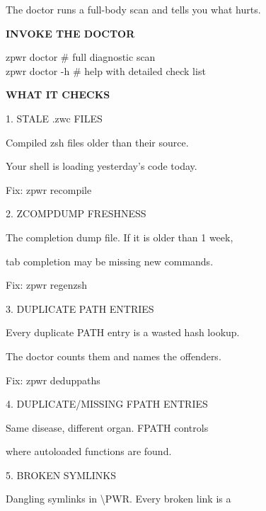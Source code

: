 \documentclass[11pt,a4paper,twoside]{book}
\begin{document}
The doctor runs a full-body scan and tells you what hurts.


\vspace{12pt}
{\bfseries\color{neonyellow} INVOKE THE DOCTOR}\vspace{4pt}

\begin{codebox}
zpwr doctor              \# full diagnostic scan\\
zpwr doctor -h           \# help with detailed check list\\
\end{codebox}


\vspace{12pt}
{\bfseries\color{neonyellow} WHAT IT CHECKS}\vspace{4pt}

1. STALE .zwc FILES

Compiled zsh files older than their source.

Your shell is loading yesterday's code today.

\begin{codebox}
Fix: zpwr recompile\\
\end{codebox}

2. ZCOMPDUMP FRESHNESS

The completion dump file. If it is older than 1 week,

tab completion may be missing new commands.

\begin{codebox}
Fix: zpwr regenzsh\\
\end{codebox}

3. DUPLICATE PATH ENTRIES

Every duplicate PATH entry is a wasted hash lookup.

The doctor counts them and names the offenders.

\begin{codebox}
Fix: zpwr deduppaths\\
\end{codebox}

4. DUPLICATE/MISSING FPATH ENTRIES

Same disease, different organ. FPATH controls

where autoloaded functions are found.

5. BROKEN SYMLINKS

Dangling symlinks in \textbackslash{}PWR. Every broken link is a
\end{document}
